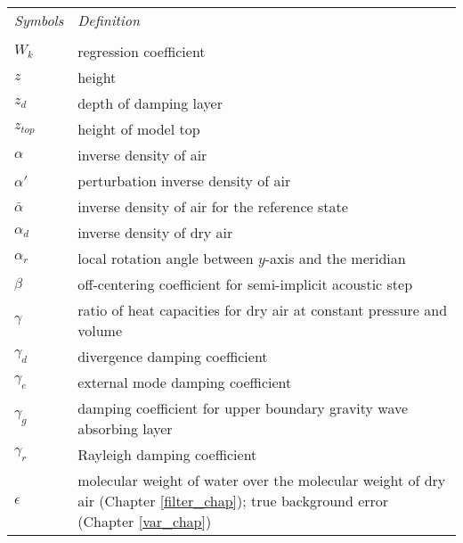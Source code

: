 \newpage
\begin{tabular}{ l p{5.5in} }
{\em Symbols}  & {\em Definition} \\
\\
$W_k$          & regression coefficient \\
$z$            & height \\
$z_d$          & depth of damping layer \\
$z_{top}$      & height of model top \\

$\alpha$       & inverse density of air \\  
$\alpha'$      & perturbation inverse density of air \\  
$\bar\alpha$   & inverse density of air for the reference state \\  
$\alpha_d$     & inverse density of dry air \\  
$\alpha_r$     & local rotation angle between $y$-axis and the meridian \\  
$\beta$        & off-centering coefficient for semi-implicit acoustic step \\  
$\gamma$       & ratio of heat capacities for dry air at constant pressure and volume \\
$\gamma_d$     & divergence damping coefficient \\
$\gamma_e$     & external mode damping coefficient \\
$\gamma_g$     & damping coefficient for upper boundary gravity wave absorbing layer \\
$\gamma_r$     & Rayleigh damping coefficient \\
$\epsilon$     & molecular weight of water over the molecular weight of dry air (Chapter \ref{filter_chap}); true background error (Chapter \ref{var_chap}) \\


\end{tabular}
